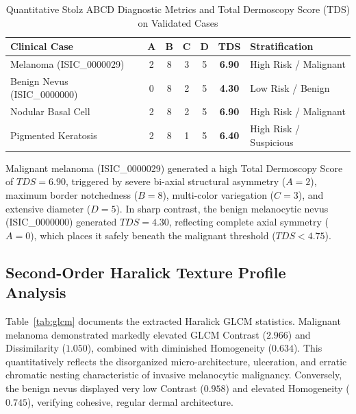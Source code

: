 \documentclass[conference]{IEEEtran}
\begin{document}
\begin{table}[htbp]
\caption{Quantitative Stolz ABCD Diagnostic Metrics and Total Dermoscopy Score (TDS) on Validated Cases}
\label{tab:results}
\centering
\setlength{\tabcolsep}{4.5pt}
\renewcommand{\arraystretch}{1.2}
\begin{tabularx}{\columnwidth}{@{}l c c c c c Y@{}}
\toprule
\textbf{Clinical Case} & \textbf{A} & \textbf{B} & \textbf{C} & \textbf{D} & \textbf{TDS} & \textbf{Stratification} \\
\midrule
Melanoma (ISIC\_0000029) & 2 & 8 & 3 & 5 & \textbf{6.90} & High Risk / Malignant \\
Benign Nevus (ISIC\_0000000) & 0 & 8 & 2 & 5 & \textbf{4.30} & Low Risk / Benign \\
Nodular Basal Cell & 2 & 8 & 2 & 5 & \textbf{6.90} & High Risk / Malignant \\
Pigmented Keratosis & 2 & 8 & 1 & 5 & \textbf{6.40} & High Risk / Suspicious \\
\bottomrule
\end{tabularx}
\end{table}

Malignant melanoma (ISIC\_0000029) generated a high Total Dermoscopy Score of $TDS = 6.90$, triggered by severe bi-axial structural asymmetry ($A=2$), maximum border notchedness ($B=8$), multi-color variegation ($C=3$), and extensive diameter ($D=5$). In sharp contrast, the benign melanocytic nevus (ISIC\_0000000) generated $TDS = 4.30$, reflecting complete axial symmetry ($A=0$), which places it safely beneath the malignant threshold ($TDS < 4.75$).

\subsection{Second-Order Haralick Texture Profile Analysis}
Table~\ref{tab:glcm} documents the extracted Haralick GLCM statistics. Malignant melanoma demonstrated markedly elevated GLCM Contrast ($2.966$) and Dissimilarity ($1.050$), combined with diminished Homogeneity ($0.634$). This quantitatively reflects the disorganized micro-architecture, ulceration, and erratic chromatic nesting characteristic of invasive melanocytic malignancy. Conversely, the benign nevus displayed very low Contrast ($0.958$) and elevated Homogeneity ($0.745$), verifying cohesive, regular dermal architecture.
\end{document}
